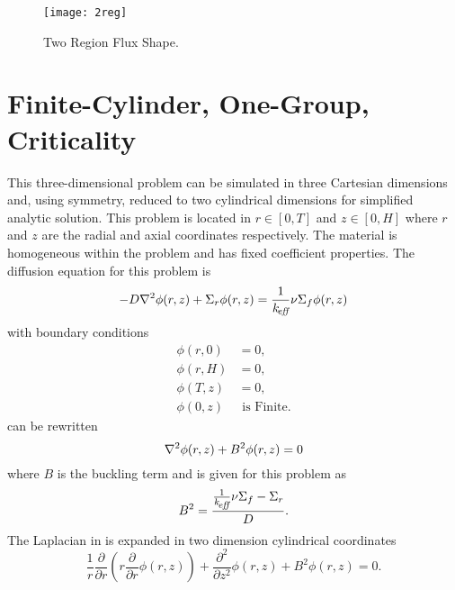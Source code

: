   \begin{figure}
    \centering
    \texttt{[image: 2reg]}
    \caption{Two Region Flux Shape.}
    \label{fig:2reg}
  \end{figure}

\section{Finite-Cylinder, One-Group, Criticality}
  \label{sec:deriv_finite_cyl}
  This three-dimensional problem can be simulated in three Cartesian dimensions 
  and, using symmetry, reduced to two cylindrical dimensions for simplified 
  analytic solution. This problem is located in $r \in [0,T]$ and $z \in [0,H]$
  where $r$ and $z$ are the radial and axial coordinates respectively. The
  material is homogeneous within the problem and has fixed coefficient
  properties. The diffusion equation for this problem is 
  \begin{equation}
    \label{eq:finite_cyl}
    -D \mathbf{\nabla}^2 \phi(r,z) + \Sigma_r \phi(r,z) = \frac{1}{k_{\!\mbox{\scriptsize \em eff}}} \nu \Sigma_f
      \phi(r,z)
  \end{equation}
  with boundary conditions
  \begin{align}
    \label{eq:finite_cyl_bcz0}
    \phi(r,0) &= 0 ,\\
    \label{eq:finite_cyl_bczH}
    \phi(r,H) &= 0 ,\\
    \label{eq:finite_cyl_bcrT}
    \phi(T,z) &= 0 ,\\
    \label{eq:finite_cyl_bcr0}
    \phi(0,z) & \text{ is Finite}.
  \end{align}
   can be rewritten
  \begin{equation}
    \label{eq:finite_cyl_buckle}
    \mathbf{\nabla}^2 \phi(r,z) + B^2 \phi(r,z) = 0
  \end{equation}
  where $B$ is the buckling term and is given for this problem as
  \begin{equation}
    \label{eq:finite_cyl_b2}
    B^2 = \frac{\frac{1}{k_{\!\mbox{\scriptsize \em eff}}} \nu \Sigma_f - \Sigma_r }{D}.
  \end{equation}
  The Laplacian in  is expanded in two dimension
  cylindrical coordinates
  \begin{equation}
    \label{eq:finite_cyl_deriv}
    \frac{1}{r} \frac{\partial}{\partial r} \left( r \frac{\partial}{\partial r}
      \phi(r,z) \right) + \frac{\partial^2}{\partial z^2} \phi(r,z) + 
      B^2 \phi(r,z) = 0.
  \end{equation}
